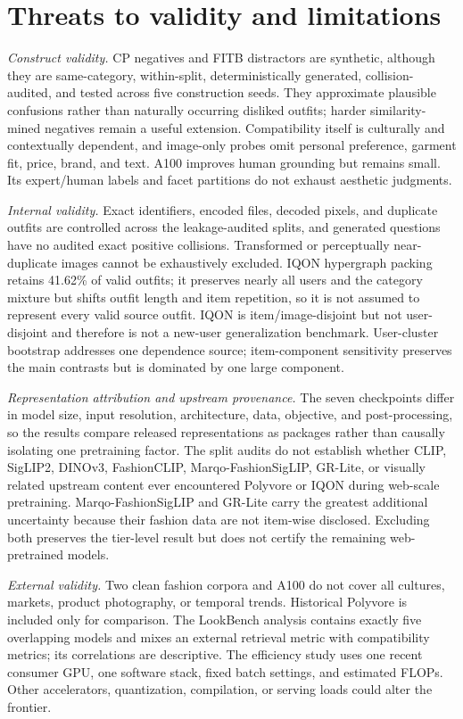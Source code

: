 \documentclass[pdflatex,sn-mathphys-num,iicol]{sn-jnl}
\begin{document}
\section{Threats to validity and limitations}\label{sec:limitations}

\textit{Construct validity.} CP negatives and FITB distractors are synthetic, although they are same-category, within-split, deterministically generated, collision-audited, and tested across five construction seeds. They approximate plausible confusions rather than naturally occurring disliked outfits; harder similarity-mined negatives remain a useful extension. Compatibility itself is culturally and contextually dependent, and image-only probes omit personal preference, garment fit, price, brand, and text. A100 improves human grounding but remains small. Its expert/human labels and facet partitions do not exhaust aesthetic judgments.

\textit{Internal validity.} Exact identifiers, encoded files, decoded pixels, and duplicate outfits are controlled across the leakage-audited splits, and generated questions have no audited exact positive collisions. Transformed or perceptually near-duplicate images cannot be exhaustively excluded. IQON hypergraph packing retains 41.62\% of valid outfits; it preserves nearly all users and the category mixture but shifts outfit length and item repetition, so it is not assumed to represent every valid source outfit. IQON is item/image-disjoint but not user-disjoint and therefore is not a new-user generalization benchmark. User-cluster bootstrap addresses one dependence source; item-component sensitivity preserves the main contrasts but is dominated by one large component.

\textit{Representation attribution and upstream provenance.} The seven checkpoints differ in model size, input resolution, architecture, data, objective, and post-processing, so the results compare released representations as packages rather than causally isolating one pretraining factor. The split audits do not establish whether CLIP, SigLIP2, DINOv3, FashionCLIP, Marqo-FashionSigLIP, GR-Lite, or visually related upstream content ever encountered Polyvore or IQON during web-scale pretraining. Marqo-FashionSigLIP and GR-Lite carry the greatest additional uncertainty because their fashion data are not item-wise disclosed. Excluding both preserves the tier-level result but does not certify the remaining web-pretrained models.

\textit{External validity.} Two clean fashion corpora and A100 do not cover all cultures, markets, product photography, or temporal trends. Historical Polyvore is included only for comparison. The LookBench analysis contains exactly five overlapping models and mixes an external retrieval metric with compatibility metrics; its correlations are descriptive. The efficiency study uses one recent consumer GPU, one software stack, fixed batch settings, and estimated FLOPs. Other accelerators, quantization, compilation, or serving loads could alter the frontier.
\end{document}
